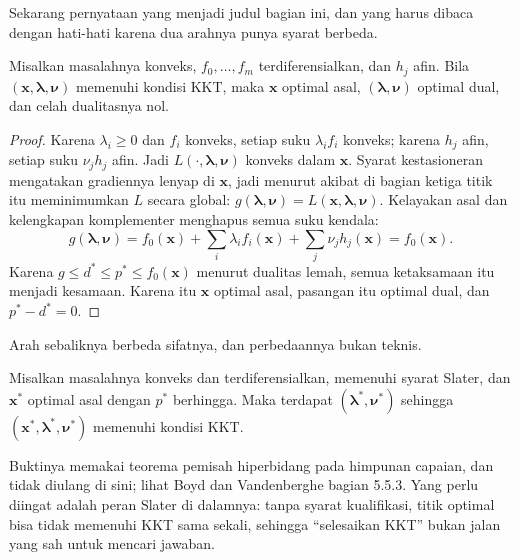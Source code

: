 Sekarang pernyataan yang menjadi judul bagian ini, dan yang harus dibaca dengan hati-hati
karena dua arahnya punya syarat berbeda.

\begin{teorema}
Misalkan masalahnya konveks, $f_{0},\dots,f_{m}$ terdiferensialkan, dan $h_{j}$ afin.
Bila $(\mathbf{x},\boldsymbol{\lambda},\boldsymbol{\nu})$ memenuhi kondisi KKT, maka
$\mathbf{x}$ optimal asal, $(\boldsymbol{\lambda},\boldsymbol{\nu})$ optimal dual, dan
celah dualitasnya nol.
\end{teorema}

\begin{proof}
Karena $\lambda_{i}\ge0$ dan $f_{i}$ konveks, setiap suku $\lambda_{i}f_{i}$ konveks;
karena $h_{j}$ afin, setiap suku $\nu_{j}h_{j}$ afin. Jadi
$L(\cdot,\boldsymbol{\lambda},\boldsymbol{\nu})$ konveks dalam $\mathbf{x}$. Syarat
kestasioneran mengatakan gradiennya lenyap di $\mathbf{x}$, jadi menurut akibat di bagian
ketiga titik itu meminimumkan $L$ secara global:
$g(\boldsymbol{\lambda},\boldsymbol{\nu})=L(\mathbf{x},\boldsymbol{\lambda},
\boldsymbol{\nu})$. Kelayakan asal dan kelengkapan komplementer menghapus semua suku
kendala:
\[
  g(\boldsymbol{\lambda},\boldsymbol{\nu})
  =f_{0}(\mathbf{x})+\sum_{i}\lambda_{i}f_{i}(\mathbf{x})
   +\sum_{j}\nu_{j}h_{j}(\mathbf{x})=f_{0}(\mathbf{x}).
\]
Karena $g\le d^{*}\le p^{*}\le f_{0}(\mathbf{x})$ menurut dualitas lemah, semua
ketaksamaan itu menjadi kesamaan. Karena itu $\mathbf{x}$ optimal asal, pasangan itu
optimal dual, dan $p^{*}-d^{*}=0$.
\end{proof}

Arah sebaliknya berbeda sifatnya, dan perbedaannya bukan teknis.

\begin{teorema}
Misalkan masalahnya konveks dan terdiferensialkan, memenuhi syarat Slater, dan
$\mathbf{x}^{*}$ optimal asal dengan $p^{*}$ berhingga. Maka terdapat
$(\boldsymbol{\lambda}^{*},\boldsymbol{\nu}^{*})$ sehingga
$(\mathbf{x}^{*},\boldsymbol{\lambda}^{*},\boldsymbol{\nu}^{*})$ memenuhi kondisi KKT.
\end{teorema}

Buktinya memakai teorema pemisah hiperbidang pada himpunan capaian, dan tidak diulang di
sini; lihat Boyd dan Vandenberghe bagian 5.5.3. Yang perlu diingat adalah peran Slater di
dalamnya: tanpa syarat kualifikasi, titik optimal bisa tidak memenuhi KKT sama sekali,
sehingga ``selesaikan KKT'' bukan jalan yang sah untuk mencari jawaban.

